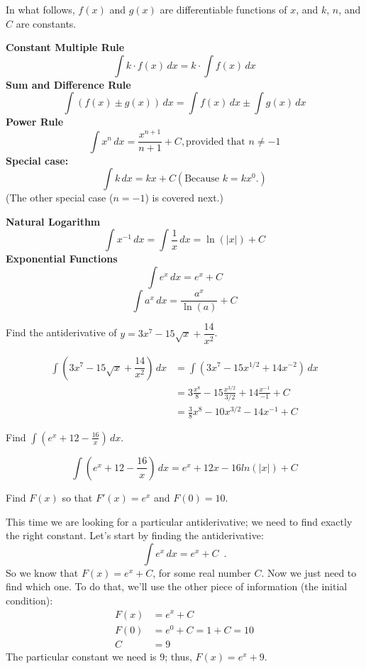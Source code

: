\begin{theorem}
In what follows, $f(x)$ and $g(x)$ are differentiable functions of $x$, and $k$, $n$, and $C$ are constants.

{\bf Constant Multiple Rule}
$$\int k\cdot f(x)\, dx =k\cdot \int f(x)\, dx $$
{\bf Sum and Difference Rule}
$$\int(f(x)\pm g(x))\, dx =\int f(x)\, dx \pm \int g(x)\, dx $$
{\bf Power Rule}
$$\int x^n\, dx = \frac{x^{n+1}}{n+1} + C, \text{provided that }n\neq -1$$
{\bf Special case:}
$$\int k\, dx = kx+C (\text{Because }k=kx^0.)$$
(The other special case ($n=-1$) is covered next.)

{\bf Natural Logarithm}
$$\int x^{-1}\, dx =\int \frac{1}{x}\, dx = \ln(|x|)+C$$
{\bf Exponential Functions}
$$\int e^x\, dx =e^x+C$$
$$\int a^x\, dx =\frac{a^x}{\ln(a)}+C$$
\end{theorem}

\begin{example}
Find the antiderivative of $y=3x^7-15\sqrt{x} + \dfrac{14}{x^2}$.

\begin{solution}
\begin{align*}
\int(3x^7-15\sqrt{x} + \dfrac{14}{x^2})\, dx &= \int(3x^7-15x^{1/2} + 14x^{-2})\, dx \\
  &=  3\frac{x^8}{8} - 15 \frac{x^{3/2}}{3/2} + 14\frac{x^{-1}}{-1} + C\\
  &= \frac{3}{8}x^8 - 10x^{3/2} - 14x^{-1} + C
\end{align*}
\end{solution}\end{example}

\begin{example}
Find $\int\left(e^x+12-\frac{16}{x}\right)\, dx$.

\begin{solution}
  $$\int\left(e^x+12-\frac{16}{x}\right)\, dx =e^x+12x-16ln(|x|)+C$$
\end{solution}\end{example}

\begin{example}
Find $F(x)$ so that $F'(x)=e^x$ and $F(0)=10$.

\begin{solution}
This time we are looking for a particular antiderivative; we need to find exactly the right constant. Let's start by finding the antiderivative:
$$\int e^x\, dx = e^x+C \enspace .$$
So we know that $F(x)=e^x+C$, for some real number $C$. Now we just need to find which one. To do that, we'll use the other piece of information (the initial condition):
\begin{align*}
F(x) &= e^x+C \\
F(0) &= e^0+C = 1+C=10 \\
C &= 9
\end{align*}
The particular constant we need is 9; thus, $F(x) = e^x + 9$.
\end{solution}\end{example}

